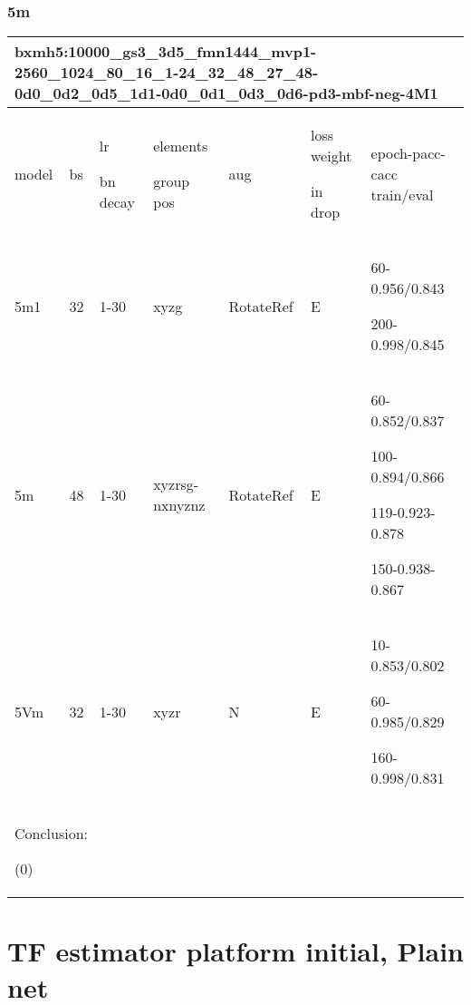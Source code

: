 \documentclass[,table,dvipsnames]{article}
\begin{document}
\subsubsection{5m}
\noindent
\begin{tabular}{|p{1.5cm}|p{1.5cm}|p{1cm}|p{1.5cm}|p{1.5cm}|p{1.5cm}|p{5cm}| }
	\hline
	\multicolumn{7}{|p{14cm}|}{bxmh5:10000\_gs3\_3d5\_fmn1444\_mvp1-2560\_1024\_80\_16\_1-24\_32\_48\_27\_48-0d0\_0d2\_0d5\_1d1-0d0\_0d1\_0d3\_0d6-pd3-mbf-neg-4M1\par 
	}\\
	\hline
	model & bs& lr\par bn decay & elements\par group pos & aug & loss weight\par in drop & epoch-pacc-cacc train/eval \\
	\hline
	
	5m1 & 32 & 1-30 & xyzg & RotateRef & E & 60-0.956/0.843\par 200-0.998/0.845\\
	\hline 
	5m & 48 & 1-30 & xyzrsg-nxnyznz & RotateRef & E & 60-0.852/0.837\par 100-0.894/0.866\par 119-0.923-0.878\par 150-0.938-0.867\\
	\hline 
	5Vm & 32 & 1-30 & xyzr & N & E &10-0.853/0.802\par 60-0.985/0.829\par 160-0.998/0.831\\
	\hline 
	\multicolumn{7}{|p{16cm}|}{ Conclusion:\par	
		(0)  } \\
	\hline	
\end{tabular}

\section{TF estimator platform initial, Plain net}	
\end{document}
